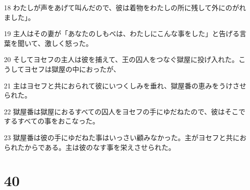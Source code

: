 \par 18 わたしが声をあげて叫んだので、彼は着物をわたしの所に残して外にのがれました」。
\par 19 主人はその妻が「あなたのしもべは、わたしにこんな事をした」と告げる言葉を聞いて、激しく怒った。
\par 20 そしてヨセフの主人は彼を捕えて、王の囚人をつなぐ獄屋に投げ入れた。こうしてヨセフは獄屋の中におったが、
\par 21 主はヨセフと共におられて彼にいつくしみを垂れ、獄屋番の恵みをうけさせられた。
\par 22 獄屋番は獄屋におるすべての囚人をヨセフの手にゆだねたので、彼はそこでするすべての事をおこなった。
\par 23 獄屋番は彼の手にゆだねた事はいっさい顧みなかった。主がヨセフと共におられたからである。主は彼のなす事を栄えさせられた。

\chapter{40}

